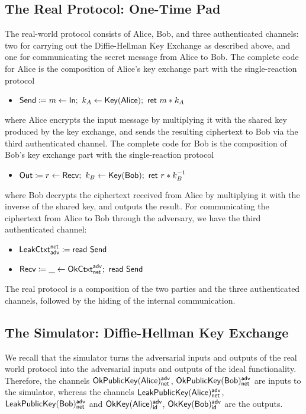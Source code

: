 \subsection{The Real Protocol: One-Time Pad}
The real-world protocol consists of Alice, Bob, and three authenticated channels: two for carrying out the Diffie-Hellman Key Exchange as described above, and one for communicating the secret message from Alice to Bob. The complete code for Alice is the composition of Alice's key exchange part with the single-reaction protocol
\begin{itemize}
\item $\Send \coloneqq m \leftarrow \In; \ k_A \leftarrow \Key(\Alice); \ \ret{m * k_A}$
\end{itemize}
where Alice encrypts the input message by multiplying it with the shared key produced by the key exchange, and sends the resulting ciphertext to Bob via the third authenticated channel. The complete code for Bob is the composition of Bob's key exchange part with the single-reaction protocol
\begin{itemize}
\item $\Out \coloneqq r \leftarrow \Recv; \ k_B \leftarrow \Key(\Bob); \ \ret{r * k_B^{-1}}$
\end{itemize}
where Bob decrypts the ciphertext received from Alice by multiplying it with the inverse of the shared key, and outputs the result. For communicating the ciphertext from Alice to Bob through the adversary, we have the third authenticated channel:
\begin{itemize}
\item $\mathsf{LeakCtxt}^{\mathsf{net}}_{\mathsf{adv}} \coloneqq \mathsf{read} \ \mathsf{Send}$
\item $\mathsf{Recv} \coloneqq \_ \leftarrow \mathsf{OkCtxt}^{\mathsf{adv}}_{\mathsf{net}}; \ \mathsf{read} \ \mathsf{Send}$
\end{itemize}
The real protocol is a composition of the two parties and the three authenticated channels, followed by the hiding of the internal communication. 

\subsection{The Simulator: Diffie-Hellman Key Exchange}
We recall that the simulator turns the adversarial inputs and outputs of the real world protocol into the adversarial inputs and outputs of the ideal functionality. Therefore, the channels $\mathsf{OkPublicKey}(\mathsf{Alice})^{\mathsf{adv}}_{\mathsf{net}}$, $\mathsf{OkPublicKey}(\mathsf{Bob})^{\mathsf{adv}}_{\mathsf{net}}$ are inputs to the simulator, whereas the channels $\mathsf{LeakPublicKey}(\mathsf{Alice})^{\mathsf{adv}}_{\mathsf{net}}$, $\mathsf{LeakPublicKey}(\mathsf{Bob})^{\mathsf{adv}}_{\mathsf{net}}$ and $\mathsf{OkKey}(\mathsf{Alice})^{\mathsf{adv}}_{\mathsf{id}}$, $ \mathsf{OkKey}(\mathsf{Bob})^{\mathsf{adv}}_{\mathsf{id}}$ are the outputs.

